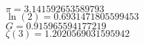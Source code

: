 \documentclass[12pt]{book}
\author{andersonwu2000}
\begin{document}
\begin{CJK}{UTF8}{bsmi}



$\pi = 3.141592653589793$ \\
$\ln(2) = 0.6931471805599453$ \\
$G = 0.915965594177219$ \\
$\zeta(3)=1.2020569031595942$ \\


\end{CJK}
\end{document}
